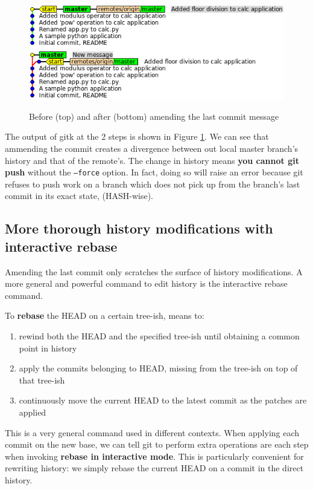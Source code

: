 \documentclass{../../common/tufte-latex/tufte-handout}
\begin{document}
\begin{figure}%
  \centering
  \includegraphics[width=0.85\linewidth]{gitcommit-amend.png}
  \label{fig:gitcommit-amend}
  \caption{Before (top) and after (bottom) amending the last commit message}
\end{figure}

The output of gitk at the 2 steps is shown in Figure \ref{fig:gitcommit-amend}.
We can see that ammending the commit creates a divergence between out local master branch's history and that of the remote's.
The change in history means \textbf{you cannot git push} without the \texttt{--force} option. 
In fact, doing so will raise an error because git refuses to push work on a branch which does not pick up from the branch's last commit in its exact state, (HASH-wise).

\subsection{More thorough history modifications with interactive rebase}
Amending the last commit only scratches the surface of history modifications.
A more general and powerful command to edit history is the interactive rebase command.

To \textbf{rebase} the HEAD on a certain tree-ish, means to:

\begin{enumerate} 
 \item{rewind both the HEAD and the specified tree-ish until obtaining a common point in history}
 \item{apply the commits belonging to HEAD, missing from the tree-ish on top of that tree-ish}
 \item{continuously move the current HEAD to the latest commit as the patches are applied}
\end{enumerate}

This is a very general command used in different contexts.
When applying each commit on the new base, we can tell git to perform extra operations are each step when invoking \textbf{rebase in interactive mode}.
This is particularly convenient for rewriting history: we simply rebase the current HEAD on a commit in the direct history.
\end{document}
